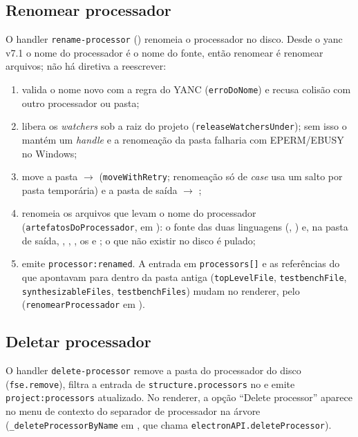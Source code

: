 \subsection{Renomear processador}
\label{sec:rename}

O handler \lstinline|rename-processor| () renomeia o
processador no disco. Desde o yanc v7.1 o nome do processador é o nome do fonte,
então renomear é renomear arquivos; não há diretiva a reescrever:

\begin{enumerate}[leftmargin=1.8em]
  \item valida o nome novo com a regra do YANC (\lstinline|erroDoNome|) e recusa
    colisão com outro processador ou pasta;
  \item libera os \emph{watchers} sob a raiz do projeto
    (\lstinline|releaseWatchersUnder|); sem isso o  mantém um
    \emph{handle} e a renomeação da pasta falharia com EPERM/EBUSY no Windows;
  \item move a pasta  $\rightarrow$ 
    (\lstinline|moveWithRetry|; renomeação só de \emph{case} usa um salto por
    pasta temporária) e a pasta de saída  $\rightarrow$
    ;
  \item renomeia os arquivos que levam o nome do processador
    (\lstinline|artefatosDoProcessador|, em ):
    o fonte das duas linguagens (, ) e, na pasta de
    saída, , , , os  e
    ; o que não existir no disco é pulado;
  \item emite \lstinline|processor:renamed|. A entrada em \lstinline|processors[]|
    e as referências do  que apontavam para dentro da pasta antiga
    (\lstinline|topLevelFile|, \lstinline|testbenchFile|,
    \lstinline|synthesizableFiles|, \lstinline|testbenchFiles|) mudam no renderer,
    pelo  (\lstinline|renomearProcessador| em
    ).
\end{enumerate}

\subsection{Deletar processador}

O handler \lstinline|delete-processor| remove a pasta do processador do disco
(\lstinline|fse.remove|), filtra a entrada de \lstinline|structure.processors| no
 e emite \lstinline|project:processors| atualizado. No renderer, a
opção \enquote{Delete processor} aparece no menu de contexto do separador de
processador na árvore (\lstinline|_deleteProcessorByName| em
, que chama \lstinline|electronAPI.deleteProcessor|).

